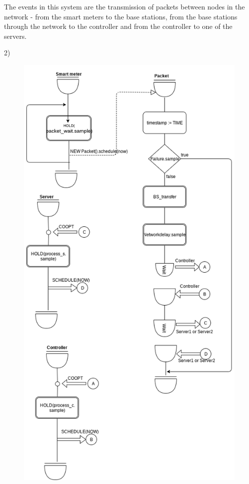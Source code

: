 \documentclass[11pt]{article}
\begin{document}
The events in this system are the transmission of packets between nodes in the network - from the smart meters to the base stations, from the base stations through the network to the controller and from the controller to one of the servers.\\

\newpage

2) 

\begin{figure}[H]
	\includegraphics[width=\textwidth,height=0.9\textheight,keepaspectratio]{activiy_diagram1.png}
	\centering
\end{figure}
\end{document}
